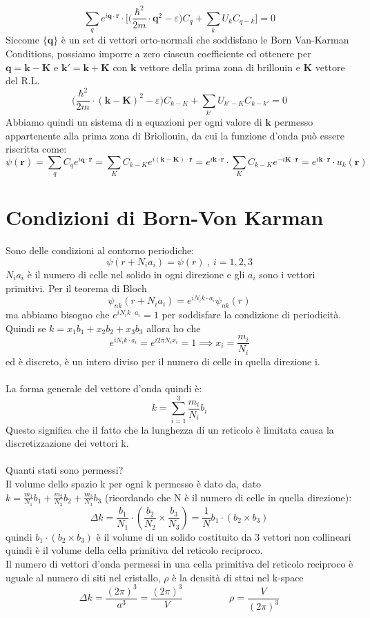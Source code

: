 \[\sum_q e^{i\mathbf{q}\cdot \mathbf{r}} \cdot \bigl[\biggr(\frac{\hbar^2}{2m}\cdot \mathbf{q}^2 -\varepsilon\biggr)C_q + \sum_{k} U_k C_{q-k}\bigr]= 0\]
Siccome $\{\mathbf{q}\}$ è un set di vettori orto-normali che soddisfano le Born Van-Karman Conditions, possiamo imporre a zero ciascun coefficiente ed ottenere per $\mathbf{q} = \mathbf{k}- \mathbf{K}$ e $\mathbf{k'}= \mathbf{k}+\mathbf{K}$ con $\mathbf{k}$ vettore della prima zona di brillouin e $\mathbf{K}$ vettore del R.L.
\[\biggr(\frac{\hbar^2}{2m}\cdot (\mathbf{k-K})^2 -\varepsilon\biggr)C_{k-K} + \sum_{k'} U_{k'-K} C_{k-k'}= 0\]
Abbiamo quindi un sistema di n equazioni per ogni valore di $\mathbf{k}$ permesso appartenente alla prima zona di Briollouin, da cui la funzione d'onda può essere riscritta come:
\[\psi(\mathbf{r}) = \sum_q C_q e^{i\mathbf{q}\cdot\mathbf{r}} = \sum_K C_{k-K}e^{i(\mathbf{k}-\mathbf{K})\cdot \mathbf{r}} =e^{i\mathbf{k}\cdot\mathbf{r}} \cdot  \sum_K C_{k-K}e^{-i\mathbf{K}\cdot \mathbf{r}} = e^{i\mathbf{k}\cdot\mathbf{r}} \cdot u_k(\mathbf{r}) \]
\section{Condizioni di Born-Von Karman}
Sono delle condizioni al contorno periodiche:
\[ \psi(r + N_i a_i) = \psi(r) \ , \ i = 1,2,3 \]
$N_i a_i$ è il numero di celle nel solido in ogni direzione e gli $a_i$ sono i vettori primitivi. Per il teorema di Bloch
\[ \psi_{nk}(r + N_i a_i) = e^{i N_i k \cdot a_i} \psi_{nk}(r) \]
ma abbiamo bisogno che $e^{i N_i k \cdot a_i} = 1$ per soddisfare la condizione di periodicità. Quindi se $k = x_1 b_1 + x_2b_2 + x_3 b_3$ allora ho che 
\[  e^{i N_i k \cdot a_i}  =  e^{i 2 \pi N_i x_i} = 1 \implies x_i = \frac{m_i}{N_i} \]
ed è discreto, è un intero diviso per il numero di celle in quella direzione i.\\\\ 
La forma generale del vettore d'onda quindi è:
\[ k = \sum_{i = 1}^3 \frac{m_i}{N_i}b_i \]
Questo significa che il fatto che la lunghezza di un reticolo è limitata causa la discretizzazione dei vettori k. \\\\
Quanti stati sono permessi? \\
Il volume dello spazio k per ogni k permesso è dato da, dato $k =  \frac{m_1}{N_1}b_1 + \frac{m_2}{N_2}b_2 + \frac{m_3}{N_3} b_3$ (ricordando che N è il numero di celle in quella direzione): 
\[ \Delta k = \frac{b_1}{N_1} \cdot \left( \frac{b_2}{N_2} \times \frac{b_3}{N_3} \right) = \frac{1}{N} b_1 \cdot (b_2 \times b_3) \]
quindi $b_1 \cdot (b_2 \times b_3)$ è il volume di un solido costituito da 3 vettori non collineari quindi è il volume della cella primitiva del reticolo reciproco. \\
Il numero di vettori d'onda permessi in una cella primitiva del reticolo reciproco è uguale al numero di siti nel cristallo, $\rho$ è la densità di sttai nel k-space
\[ \Delta k = \frac{(2\pi)^3}{a^3 } = \frac{(2\pi)^3}{V} \hspace{2cm} \rho = \frac{V}{(2\pi)^3} \]
